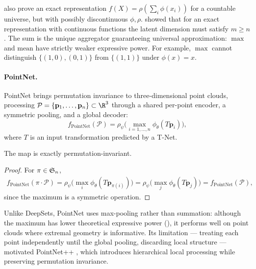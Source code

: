 \begin{remark}
\label{rem:groups:latent-dim}
\citet{zaheer2017deepsets} also prove an exact representation $f(X) =
\rho(\sum_i \phi(x_i))$ for a countable universe, but with possibly
discontinuous $\phi, \rho$. \citet{wagstaff2019limitations} showed that for an
exact representation with continuous functions the latent dimension must satisfy
$m \geq n$. The sum is the unique aggregator guaranteeing universal
approximation: $\max$ and $\text{mean}$ have strictly weaker expressive power.
For example, $\max$ cannot distinguish $\{(1,0),(0,1)\}$ from $\{(1,1)\}$ under
$\phi(x) = x$.
\end{remark}

\paragraph{PointNet.}
PointNet \citep{qi2017pointnet} brings permutation invariance to
three-dimensional point clouds, processing $\mathcal{P} = \{\mathbf{p}_1, \dots,
\mathbf{p}_n\} \subset \R^3$ through a shared per-point encoder, a symmetric
pooling, and a global decoder:
\begin{equation}
  f_{\text{PointNet}}(\mathcal{P})
  = \rho_\psi\Big(\max_{i=1,\dots,n} \phi_\theta(T \mathbf{p}_i)\Big),
  \label{eq:groups:pointnet}
\end{equation}
where $T$ is an input transformation predicted by a T-Net.

\begin{proposition}
\label{prop:groups:pointnet-invariance}
The map  is exactly permutation-invariant.
\end{proposition}

\begin{proof}
For $\pi \in \mathfrak{S}_n$,
\begin{align}
  f_{\text{PointNet}}(\pi \cdot \mathcal{P})
  = \rho_\psi\Big(\max_i \phi_\theta(T \mathbf{p}_{\pi(i)})\Big)
  = \rho_\psi\Big(\max_j \phi_\theta(T \mathbf{p}_j)\Big)
  = f_{\text{PointNet}}(\mathcal{P}),
\end{align}
since the maximum is a symmetric operation.
\end{proof}

Unlike DeepSets, PointNet uses max-pooling rather than summation: although the
maximum has lower theoretical expressive power
(), it performs well on point clouds where extremal
geometry is informative. Its limitation --- treating each point independently
until the global pooling, discarding local structure --- motivated PointNet++
\citep{qi2017pointnetplus}, which introduces hierarchical local processing while
preserving permutation invariance.

